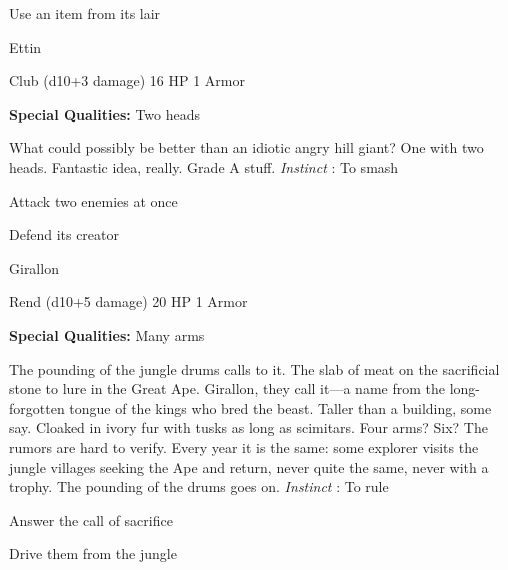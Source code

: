          
\item Use an item from its lair

       
\stopitemize
       
\startMonsterName
Ettin	 
\stopMonsterName
       

Club (d10+3 damage)	16 HP	1 Armor

       


       
\startMonsterQualities
         {\bf Special Qualities:}  Two heads
\stopMonsterQualities
       
\startMonsterDescription
What could possibly be better than an idiotic angry hill giant? One with two heads. Fantastic idea, really. Grade A stuff. {\em Instinct} : To smash
\stopMonsterDescription
       
\startitemize[1,packed]
         
\item Attack two enemies at once

         
\item Defend its creator

       
\stopitemize
       
\startMonsterName
Girallon	 
\stopMonsterName
       

Rend (d10+5 damage)	20 HP	1 Armor

       


       
\startMonsterQualities
         {\bf Special Qualities:}  Many arms
\stopMonsterQualities
       
\startMonsterDescription
The pounding of the jungle drums calls to it. The slab of meat on the sacrificial stone to lure in the Great Ape. Girallon, they call it—a name from the long-forgotten tongue of the kings who bred the beast. Taller than a building, some say. Cloaked in ivory fur with tusks as long as scimitars. Four arms? Six? The rumors are hard to verify. Every year it is the same: some explorer visits the jungle villages seeking the Ape and return, never quite the same, never with a trophy. The pounding of the drums goes on. {\em Instinct} : To rule
\stopMonsterDescription
       
\startitemize[1,packed]
         
\item Answer the call of sacrifice

         
\item Drive them from the jungle

